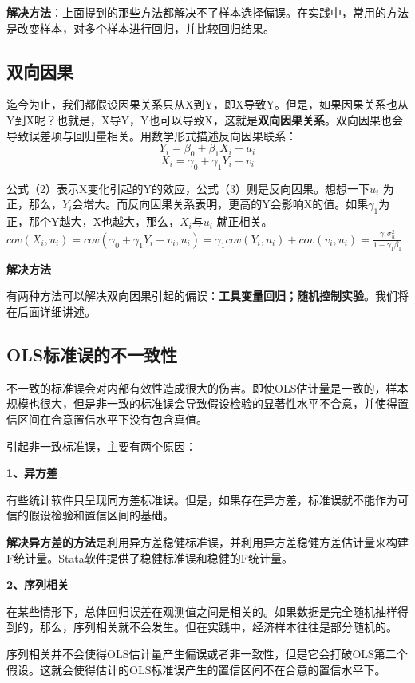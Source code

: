 \documentclass[cn,12pt,math=newtx,citestyle=gb7714-2015,bibstyle=gb7714-2015]{elegantbook}
\begin{document}
\textbf{解决方法}：上面提到的那些方法都解决不了样本选择偏误。在实践中，常用的方法是改变样本，对多个样本进行回归，并比较回归结果。

\subsection{双向因果}
迄今为止，我们都假设因果关系只从X到Y，即X导致Y。但是，如果因果关系也从Y到X呢？也就是，X导Y，Y也可以导致X，这就是\textbf{双向因果关系}。双向因果也会导致误差项与回归量相关。用数学形式描述反向因果联系：
\begin{equation}
	Y_i=\beta_0+\beta_1X_i+u_i
\end{equation}
\begin{equation}
	X_i=\gamma_0+\gamma_1Y_i+v_i
\end{equation}

公式（2）表示X变化引起的Y的效应，公式（3）则是反向因果。想想一下$u_i$ 为正，那么，$Y_i$会增大。而反向因果关系表明，更高的Y会影响X的值。如果$\gamma_1$为正，那个Y越大，X也越大，那么，$X_i$与$u_i$ 就正相关。$cov(X_i,u_i)=cov(\gamma_0+\gamma_1Y_i+v_i,u_i)=\gamma_1{cov(Y_i,u_i)}+cov(v_i,u_i)=\frac{\gamma_1\sigma_u^2}{1-\gamma_1\beta_1}$

\textbf{解决方法}

有两种方法可以解决双向因果引起的偏误：\textbf{工具变量回归；随机控制实验}。我们将在后面详细讲述。

\subsection{OLS标准误的不一致性}
不一致的标准误会对内部有效性造成很大的伤害。即使OLS估计量是一致的，样本规模也很大，但是非一致的标准误会导致假设检验的显著性水平不合意，并使得置信区间在合意置信水平下没有包含真值。

引起非一致标准误，主要有两个原因：

\textbf{1、异方差}

有些统计软件只呈现同方差标准误。但是，如果存在异方差，标准误就不能作为可信的假设检验和置信区间的基础。

\textbf{解决异方差的方法}是利用异方差稳健标准误，并利用异方差稳健方差估计量来构建F统计量。Stata软件提供了稳健标准误和稳健的F统计量。

\textbf{2、序列相关}

在某些情形下，总体回归误差在观测值之间是相关的。如果数据是完全随机抽样得到的，那么，序列相关就不会发生。但在实践中，经济样本往往是部分随机的。

序列相关并不会使得OLS估计量产生偏误或者非一致性，但是它会打破OLS第二个假设。这就会使得估计的OLS标准误产生的置信区间不在合意的置信水平下。
\end{document}
